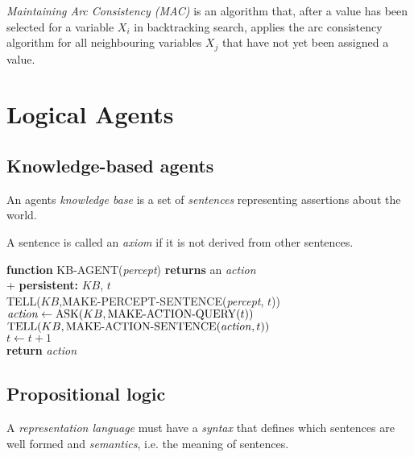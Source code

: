 \documentclass{article}
\begin{document}
\begin{definition}
    \emph{Maintaining Arc Consistency (MAC)} is an algorithm that, after a value has
    been selected for a variable $X_i$ in backtracking search, applies the arc
    consistency algorithm for all neighbouring variables $X_j$ that have not yet
    been assigned a value.
\end{definition}

\section{Logical Agents}

\subsection{Knowledge-based agents}

\begin{definition}
    An agents \emph{knowledge base} is a set of \emph{sentences} representing assertions
    about the world.
\end{definition}

\begin{definition}
    A sentence is called an \emph{axiom} if it is not derived from other sentences.
\end{definition}

\begin{pseudo}
    \textbf{function} KB-AGENT(\emph{percept}) \textbf{returns} an \emph{action} \\+
        \textbf{persistent:} $KB$, $t$\\
        TELL($KB$,MAKE-PERCEPT-SENTENCE(\emph{percept}, $t$))\\
        $\text{\emph{action}}\leftarrow\text{ASK}(KB,\text{MAKE-ACTION-QUERY}(t))$\\
        $\text{TELL}(KB, \text{MAKE-ACTION-SENTENCE}(\text{\emph{action}},t))$\\
        $t\leftarrow t+1$\\
        \textbf{return} \emph{action}
\end{pseudo}

\subsection{Propositional logic}

\begin{definition}
    A \emph{representation language} must have a \emph{syntax} that defines which
    sentences are well formed and \emph{semantics}, i.e. the meaning of sentences.
\end{definition}
\end{document}
